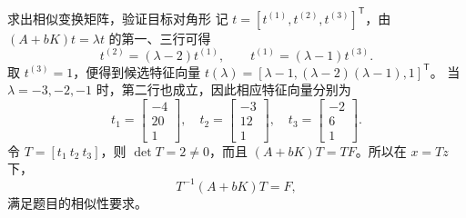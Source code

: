 \documentclass[11pt]{article}
\begin{document}
\begin{solution}
\begin{proofstep}{求出相似变换矩阵，验证目标对角形}
记 $t=[t^{(1)},t^{(2)},t^{(3)}]^{\mathsf T}$，由 $(A+bK)t=\lambda t$ 的第一、三行可得
\[
t^{(2)}=(\lambda-2)t^{(1)},\qquad t^{(1)}=(\lambda-1)t^{(3)}.
\]
取 $t^{(3)}=1$，便得到候选特征向量
$t(\lambda)=[\lambda-1,(\lambda-2)(\lambda-1),1]^{\mathsf T}$。
当 $\lambda=-3,-2,-1$ 时，第二行也成立，因此相应特征向量分别为
\[
t_1=\begin{bmatrix}-4\\20\\1\end{bmatrix},\quad
t_2=\begin{bmatrix}-3\\12\\1\end{bmatrix},\quad
t_3=\begin{bmatrix}-2\\6\\1\end{bmatrix}.
\]
令 $T=[t_1\ t_2\ t_3]$，则 $\det T=2\ne0$，而且
$(A+bK)T=TF$。所以在 $x=Tz$ 下，
\[
\boxed{T^{-1}(A+bK)T=F,}
\]
满足题目的相似性要求。
\end{proofstep}
\end{solution}
\end{document}
